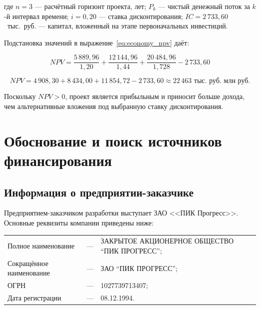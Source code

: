 где $n = 3$ --- расчётный горизонт проекта, лет;
$P_k$ --- чистый денежный поток за $k$-й интервал времени;
$i = 0{,}20$ --- ставка дисконтирования;
$IC = 2\,733{,}60$~тыс.~руб. --- капитал, вложенный на этапе первоначальных инвестиций.

Подстановка значений в выражение~\eqref{eq:economy_npv} даёт:

\begin{equation}
	NPV = \frac{5\,889{,}96}{1{,}20} + \frac{12\,144{,}96}{1{,}44} + \frac{20\,484{,}96}{1{,}728} - 2\,733{,}60
	\label{eq:economy_npv_subst}
\end{equation}

\begin{equation}
	NPV = 4\,908{,}30 + 8\,434{,}00 + 11\,854{,}72 - 2\,733{,}60 \approx 22\,463 \text{ тыс. руб.} \text{ млн руб.}
	\label{eq:economy_npv_value}
\end{equation}

Поскольку $NPV > 0$, проект является прибыльным и приносит больше дохода, чем альтернативные вложения под выбранную ставку дисконтирования.


\section{Обоснование и поиск источников финансирования}
\label{sec:economy_funding}

\subsection{Информация о предприятии-заказчике}
\label{subsec:company_info}

Предприятием-заказчиком разработки выступает ЗАО <<ПИК Прогресс>>. Основные реквизиты компании приведены ниже:

\begin{table}[h!]
	\centering
	\begin{tabular}{>{\centering\arraybackslash}l l p{8cm}}
		Полное наименование 	& --- & ЗАКРЫТОЕ АКЦИОНЕРНОЕ ОБЩЕСТВО \enquote{ПИК ПРОГРЕСС}; \\
		Сокращённое наименование & --- & ЗАО \enquote{ПИК ПРОГРЕСС}; \\
		ОГРН 					& --- & 1027739713407; \\
		Дата регистрации 		& --- & 08.12.1994. \\
	\end{tabular}
\end{table}

